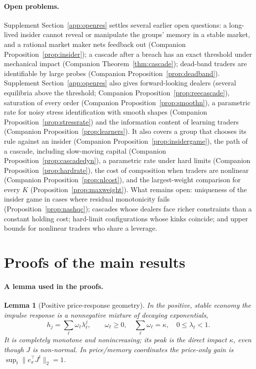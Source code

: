 \documentclass[12pt]{article}
\newtheorem{lemma}[theorem]{Lemma}
\theoremstyle{definition}
\theoremstyle{remark}
\begin{document}
\paragraph{Open problems.} Supplement Section~\ref{app:openres} settles several earlier open questions: a long-lived insider cannot reveal or manipulate the groups' memory in a stable market, and a rational market maker nets feedback out (Companion Proposition~\ref{prop:insider}); a cascade after a breach has an exact threshold under mechanical impact (Companion Theorem~\ref{thm:cascade}); dead-band traders are identifiable by large probes (Companion Proposition~\ref{prop:deadband}). Supplement Section~\ref{app:openres} also gives forward-looking dealers (several equilibria above the threshold; Companion Proposition~\ref{prop:reecascade}), saturation of every order (Companion Proposition~\ref{prop:smoothn}), a parametric rate for noisy stress identification with smooth shapes (Companion Proposition~\ref{prop:stressrate}) and the information content of learning traders (Companion Proposition~\ref{prop:learners}). It also covers a group that chooses its rule against an insider (Companion Proposition~\ref{prop:insidergame}), the path of a cascade, including slow-moving capital (Companion Proposition~\ref{prop:cascadedyn}), a parametric rate under hard limits (Companion Proposition~\ref{prop:hardrate}), the cost of composition when traders are nonlinear (Companion Proposition~\ref{prop:nlcost}), and the largest-weight comparison for every $K$ (Proposition~\ref{prop:maxweight}). What remains open: uniqueness of the insider game in cases where residual monotonicity fails (Proposition~\ref{prop:nashqc}); cascades whose dealers face richer constraints than a constant holding cost; hard-limit configurations whose kinks coincide; and upper bounds for nonlinear traders who share a leverage.



\section{Proofs of the main results}\label{app:proofs}

\paragraph{A lemma used in the proofs.}
\begin{lemma}[Positive price-response geometry]\label{lem:cm}
In the positive, stable economy the impulse response is a nonnegative mixture of decaying exponentials,
\[
h_j=\sum_\ell \omega_\ell\lambda_\ell^j,\qquad \omega_\ell\ge0,\quad \sum_\ell\omega_\ell=\kappa,\quad 0\le\lambda_\ell<1 .
\]
It is completely monotone and nonincreasing; its peak is the direct impact $\kappa$, even though $J$ is non-normal. In price/memory coordinates the price-only gain is $\sup_t\|e_x^\top J^t\|_2=1$.
\end{lemma}
\end{document}

